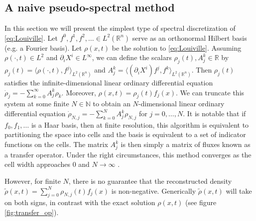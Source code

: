 \documentclass[letterpaper, 12 pt]{amsart}
\newcommand{\R}{\mathbb{R}}
\begin{document}
\subsection{A naive pseudo-spectral method}
\label{sec:naive}
  In this section we will present the simplest type of
  spectral discretization of \eqref{eq:Louiville}.
  Let $f^0,f^1,f^2,\dots \in L^2(\R^n)$ serve as an
  orthonormal Hilbert basis (e.g. a Fourier basis).
  Let $\rho(x,t)$ be the solution to \eqref{eq:Louiville}.
  Assuming $\rho(\cdot,t) \in L^2$ and $\partial_i X^i \in L^{\infty}$,
  we can define the scalars $\rho_j(t), A^k_j \in \R$
  by $\rho_j(t) = \langle \rho(\cdot ,t) , f^j \rangle_{L^2(\R^n)}$
  and $A^k_j = \langle (\partial_i X^i) f^j , f^k \rangle_{L^2(\R^n)}$.
  Then $\rho_j(t)$ satisfies the infinite-dimensional linear
  ordinary differential equation
  $
    \dot{\rho}_j = - \sum_{k=0}^{\infty}A^k_j \rho_k
  $.
  Moreover, $\rho(x,t) = \rho_j(t) f_j(x)$.
  We can truncate this system at some finite $N \in \mathbb{N}$
  to obtain an $N$-dimensional linear ordinary differential equation
  $\dot{\rho}_{N,j} = -\sum_{k=0}^{N} A^k_j \rho_{N,j}$ for $j=0,\dots,N$.
  It is notable that if $f_0,f_1,\dots$ is a Haar basis, then
  at finite resolution, this algorithm is equivalent to 
  partitioning the space into cells and the basis is equivalent
  to a set of indicator functions on the cells.
  The matrix $A^k_j$ is then simply a matrix of fluxes 
  known as a transfer operator.
  Under the right circumstances,
  this method converges as the cell width approaches $0$ and $N \to \infty$
  \cite{FroylandJungeKoltai2013}.

  However, for finite $N$, there is no guarantee that the reconstructed
  density $\tilde{\rho}(x,t) = \sum_{j=0}^N \rho_{N,j}(t) f_j(x)$
  is non-negative. 
  Generically $\tilde{\rho}(x,t)$ will take on both signs, in
  contrast with the exact solution $\rho(x,t)$ (see figure \ref{fig:transfer_op}).
  
\end{document}
